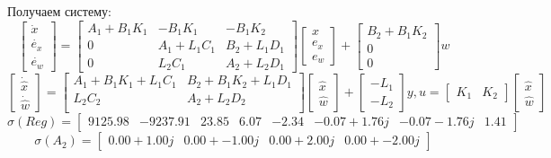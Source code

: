 Получаем систему:
\[
    \begin{bmatrix}
        \dot{x} \\
        \dot{e_x} \\
        \dot{e_w}
    \end{bmatrix} = 
    \begin{bmatrix}
        A_1 + B_1K_1 & -B_1K_1 & -B_1K_2 \\
        0 & A_1 + L_1C_1 & B_2 + L_1 D_1 \\
        0 & L_2 C_1 & A_2 + L_2 D_1
    \end{bmatrix}
    \begin{bmatrix}
        x \\
        e_x \\
        e_w
    \end{bmatrix} 
    + 
    \begin{bmatrix}
        B_2 + B_1 K_2 \\
        0 \\
        0
    \end{bmatrix} w
\]
\[
    \begin{bmatrix}
        \dot{\hat{x}} \\
        \dot{\hat{w}}
    \end{bmatrix} = 
    \begin{bmatrix}
        A_1 + B_1K_1 + L_1C_1 & B_2 + B_1K_2 + L_1D_1 \\
        L_2C_2 & A_2 + L_2D_2 \\
    \end{bmatrix}
    \begin{bmatrix}
        \hat{x} \\
        \hat{w}
    \end{bmatrix}
    +
    \begin{bmatrix}
        -L_1 \\ -L_2 
    \end{bmatrix}y, u = \begin{bmatrix}
        K_1 & K_2 
    \end{bmatrix}\begin{bmatrix}
        {\hat{x}} \\ {\hat{w}} 
    \end{bmatrix}
\]
\[\sigma (Reg) = \begin{bmatrix}
    9125.98 & -9237.91 &  23.85 &  6.07 & -2.34 & -0.07 + 1.76j & -0.07 -1.76j &  1.41
  \end{bmatrix}\]
  \[\sigma (A_2) = \begin{bmatrix}
    0.00 + 1.00j &  0.00 + -1.00j &  0.00 + 2.00j &  0.00 + -2.00j
  \end{bmatrix}\]

